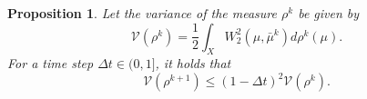 \documentclass[a4paper, 11pt]{article}
\newcommand{\R}{\mathbb{R}}
\newcommand{\Pw}{\mathcal{P}_{2}\left( \R^{d+2} \right) }
\newcommand{\PPw}{\mathcal{P}_{2}\left(X\right)}
\theoremstyle{plain} %
\newtheorem{proposition}{Proposition}
\begin{document}
	\begin{proposition}\label{prop:consensus}
		Let the variance of the measure $ \rho^k $ be given by
		\begin{equation}
			\mathcal{V}(\rho^k) = \frac{1}{2}\int_{X} W_{2}^{2}(\mu, \bar{\mu}^{k})d\rho^k(\mu).
		\end{equation}
		For a time step $ \Delta t \in (0,1] $, it holds that
		\begin{equation}
			\mathcal{V}(\rho^{k+1}) \leq \left( 1 - \Delta t \right)^{2} \mathcal{V}(\rho^{k}) .
		\end{equation}
	\end{proposition}
\end{document}
